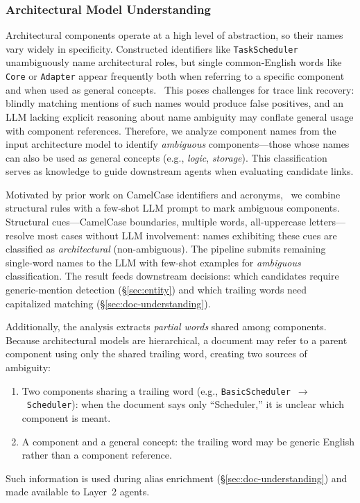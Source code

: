 \subsubsection{Architectural Model Understanding}\label{sec:model-understanding}

Architectural components operate at a high level of abstraction, so
their names vary widely in specificity.
Constructed identifiers like \texttt{TaskScheduler} unambiguously name
architectural roles, but single common-English words like
\texttt{Core} or \texttt{Adapter} appear frequently both when
referring to a specific component and when used as general
concepts.~
This poses challenges for trace link recovery: blindly matching
mentions of such names would produce false positives, and an LLM
lacking explicit reasoning about name ambiguity may conflate general
usage with component references.
Therefore, we analyze component names from the input architecture model
to identify \emph{ambiguous} components---those whose names can also
be used as general concepts (e.g., \emph{logic}, \emph{storage}).
This classification serves as knowledge to guide downstream agents
when evaluating candidate links.

Motivated by prior work on CamelCase identifiers and
acronyms,~ we combine structural rules with a few-shot
LLM prompt to mark ambiguous components.
Structural cues---CamelCase boundaries, multiple words, all-uppercase
letters---resolve most cases without LLM involvement: names exhibiting
these cues are classified as \emph{architectural} (non-ambiguous).
The pipeline submits remaining single-word names to the LLM with
few-shot examples for \emph{ambiguous} classification.
The result feeds downstream decisions:
which candidates require generic-mention detection
(\S\ref{sec:entity}) and
which trailing words need capitalized matching
(\S\ref{sec:doc-understanding}).

Additionally, the analysis extracts \emph{partial words} shared among
components.
Because architectural models are hierarchical, a document may refer to
a parent component using only the shared trailing word, creating two
sources of ambiguity:
\begin{enumerate}
  \item Two components sharing a trailing word
    (e.g., \texttt{BasicScheduler}~$\to$~\texttt{Scheduler}): when the
    document says only ``Scheduler,'' it is unclear which component is
    meant.
  \item A component and a general concept: the trailing word may be
    generic English rather than a component reference.
\end{enumerate}
Such information is used during alias enrichment
(\S\ref{sec:doc-understanding}) and made available to Layer~2 agents.

